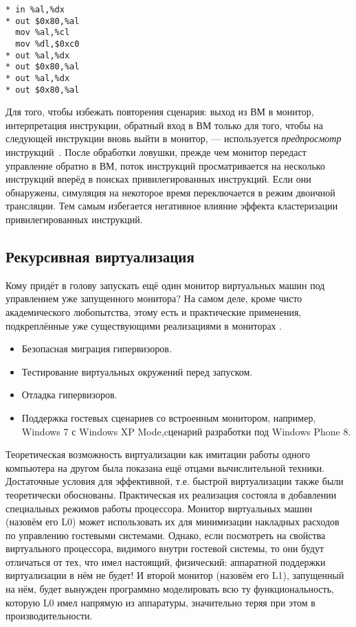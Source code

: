 \begin{lstlisting}
* in %al,%dx
* out $0x80,%al
  mov %al,%cl
  mov %dl,$0xc0
* out %al,%dx
* out $0x80,%al
* out %al,%dx
* out $0x80,%al
\end{lstlisting}

Для того, чтобы избежать повторения сценария: выход из ВМ в монитор, интерпретация инструкции, обратный вход в ВМ только для того, чтобы на следующей инструкции вновь выйти в монитор, --- используется \textit{предпросмотр} инструкций~\cite{Agesen:2012:STA:2342821.2342856}. После обработки ловушки, прежде чем монитор передаст управление обратно в ВМ, поток инструкций просматривается на несколько инструкций вперёд в поисках привилегированных инструкций. Если они обнаружены, симуляция на некоторое время переключается в режим двоичной трансляции. Тем самым избегается негативное влияние эффекта кластеризации привилегированных инструкций.

\subsection{Рекурсивная виртуализация}




Кому придёт в голову запускать ещё один монитор виртуальных машин под управлением уже запущенного монитора? На самом деле, кроме чисто академического любопытства, этому есть и практические применения, подкреплённые уже существующими реализациями в мониторах .
\begin{itemize}
\item Безопасная миграция гипервизоров.
\item Тестирование виртуальных окружений перед запуском.
\item Отладка гипервизоров.
\item Поддержка гостевых сценариев со встроенным монитором, например, Windows 7 с Windows XP Mode,cценарий разработки под Windows Phone 8.
\end{itemize}

Теоретическая возможность виртуализации как имитации работы одного компьютера на другом была показана ещё отцами вычислительной техники. Достаточные условия для эффективной, т.е. быстрой виртуализации также были теоретически обоснованы. Практическая их реализация состояла в добавлении специальных режимов работы процессора. Монитор виртуальных машин (назовём его L0) может использовать их для минимизации накладных расходов по управлению гостевыми системами.
Однако, если посмотреть на свойства виртуального процессора, видимого внутри гостевой системы, то они будут отличаться от тех, что имел настоящий, физический: аппаратной поддержки виртуализации в нём не будет! И второй монитор (назовём его L1), запущенный на нём, будет вынужден программно моделировать всю ту функциональность, которую L0 имел напрямую из аппаратуры, значительно теряя при этом в производительности.

